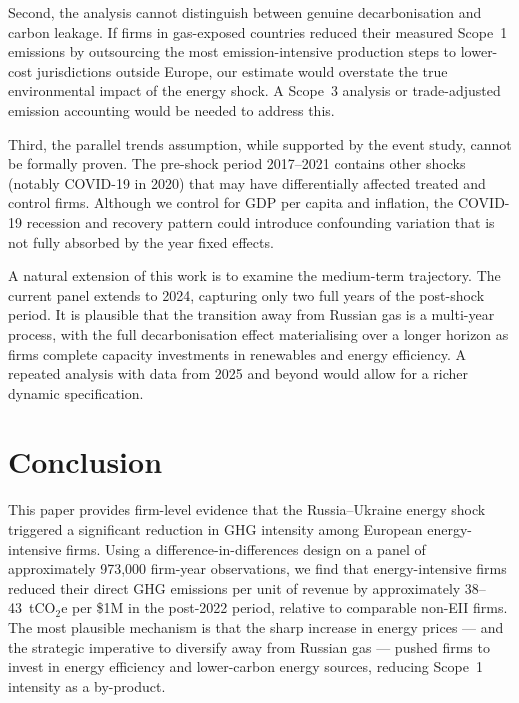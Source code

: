 \documentclass[authoryear,preprint,review,12pt]{elsarticle}
\begin{document}
Second, the analysis cannot distinguish between genuine decarbonisation and carbon leakage. If firms in gas-exposed countries reduced their measured Scope~1 emissions by outsourcing the most emission-intensive production steps to lower-cost jurisdictions outside Europe, our estimate would overstate the true environmental impact of the energy shock. A Scope~3 analysis or trade-adjusted emission accounting would be needed to address this.

Third, the parallel trends assumption, while supported by the event study, cannot be formally proven. The pre-shock period 2017--2021 contains other shocks (notably COVID-19 in 2020) that may have differentially affected treated and control firms. Although we control for GDP per capita and inflation, the COVID-19 recession and recovery pattern could introduce confounding variation that is not fully absorbed by the year fixed effects.

A natural extension of this work is to examine the medium-term trajectory. The current panel extends to 2024, capturing only two full years of the post-shock period. It is plausible that the transition away from Russian gas is a multi-year process, with the full decarbonisation effect materialising over a longer horizon as firms complete capacity investments in renewables and energy efficiency. A repeated analysis with data from 2025 and beyond would allow for a richer dynamic specification.

\section{Conclusion}
\label{sec:conclusion}

This paper provides firm-level evidence that the Russia--Ukraine energy shock triggered a significant reduction in GHG intensity among European energy-intensive firms. Using a difference-in-differences design on a panel of approximately 973,000 firm-year observations, we find that energy-intensive firms reduced their direct GHG emissions per unit of revenue by approximately 38--43~tCO$_2$e per \$1M in the post-2022 period, relative to comparable non-EII firms. The most plausible mechanism is that the sharp increase in energy prices --- and the strategic imperative to diversify away from Russian gas --- pushed firms to invest in energy efficiency and lower-carbon energy sources, reducing Scope~1 intensity as a by-product.
\end{document}
